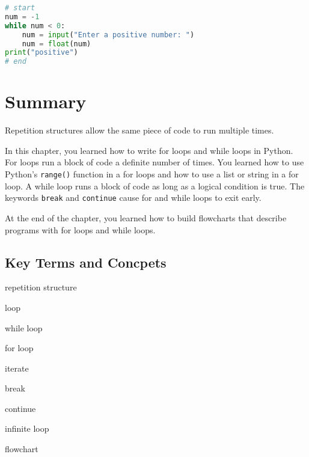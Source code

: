 \documentclass{book}
\newenvironment{key_terms}{\begin{multicols}{3}}{\end{multicols}} %
\newcommand{\passthrough}[1]{#1}
\begin{document}
\begin{lstlisting}[language=Python]
# start
num = -1
while num < 0:
    num = input("Enter a positive number: ")
    num = float(num)
print("positive")
# end
\end{lstlisting}
    




    
        \newpage
        \hypertarget{summary}{%
\section{Summary}\label{summary}}

    




    
        Repetition structures allow the same piece of code to run multiple
times.

In this chapter, you learned how to write for loops and while loops in
Python. For loops run a block of code a definite number of times. You
learned how to use Python's \passthrough{\lstinline!range()!} function
in a for loops and how to use a list or string in a for loop. A while
loop runs a block of code as long as a logical condition is true. The
keywords \passthrough{\lstinline!break!} and
\passthrough{\lstinline!continue!} cause for and while loops to exit
early.

At the end of the chapter, you learned how to build flowcharts that
describe programs with for loops and while loops.
    




    
        \hypertarget{key-terms-and-concpets}{%
\subsection{Key Terms and Concpets}\label{key-terms-and-concpets}}
    




    
        \begin{key_terms}
        repetition structure

loop

while loop

for loop

iterate

break

continue

infinite loop

flowchart
        \end{key_terms}
\end{document}

